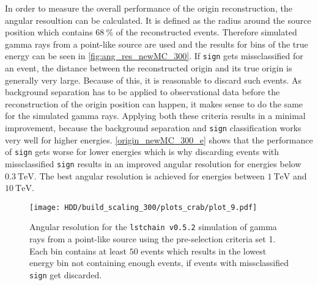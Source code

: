 In order to measure the overall performance of the origin reconstruction, the angular resoultion can be calculated.
It is defined as the radius around the source position which contains $\SI{68}{\percent}$ of the reconstructed events.
Therefore simulated gamma rays from a point-like source are used and the results for bins of the true energy can be seen in \autoref{fig:ang_res_newMC_300}.
If \texttt{sign} gets missclassified for an event, the distance between the reconstructed origin and its true origin is generally very large.
Because of this, it is reasonable to discard such events.
As background separation has to be applied to observational data before the reconstruction of the origin position can happen, it makes sense to do the same
for the simulated gamma rays.
Applying both these criteria results in a minimal improvement, because the background separation and \texttt{sign} classification works very well for higher energies.
\autoref{origin_newMC_300_e} shows that the performance of \texttt{sign} gets worse for lower energies which is why discarding events with missclassified  
\texttt{sign} results in an improved angular resolution for energies below $\SI{0.3}{\tera\electronvolt}$.
The best angular resolution is achieved for energies between $\SI{1}{\tera\electronvolt}$ and $\SI{10}{\tera\electronvolt}$.
\begin{figure}
    \centering
    \texttt{[image: HDD/build\_scaling\_300/plots\_crab/plot\_9.pdf]}
    \caption{Angular resolution for the \texttt{lstchain v0.5.2} simulation of gamma rays from a point-like source using the pre-selection criteria set 1.
        Each bin contains at least $\num{50}$ events which results in the lowest energy bin not containing enough events, if events with missclassified \texttt{sign} 
        get discarded.
    }
    \label{fig:ang_res_newMC_300}
\end{figure}

